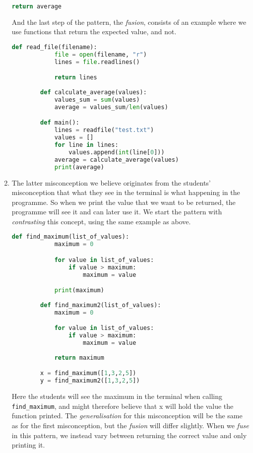 \begin{enumerate}
\begin{lstlisting}[language=Python]
            return average
    \end{lstlisting}

    And the last step of the pattern, the \emph{fusion}, consists of an 
example where we use functions that return the expected value, and not.

    \begin{lstlisting}[language=Python]
        def read_file(filename):
            file = open(filename, "r")
            lines = file.readlines()

            return lines
            
        def calculate_average(values):
            values_sum = sum(values)
            average = values_sum/len(values)

        def main():
            lines = readfile("test.txt")
            values = []
            for line in lines:
                values.append(int(line[0]))
            average = calculate_average(values)
            print(average)
    \end{lstlisting}

    \item The latter misconception we believe originates from the students' 
misconception that what they see in the terminal is what happening in 
the programme. So when we print the value that we want to be returned, 
the programme will see it and can later use it. We start the pattern 
with \emph{contrasting} this concept, using the same example as above.

     \begin{lstlisting}[language=Python]
        def find_maximum(list_of_values):
            maximum = 0

            for value in list_of_values:
                if value > maximum:
                    maximum = value

            print(maximum)
            
        def find_maximum2(list_of_values):
            maximum = 0

            for value in list_of_values:
                if value > maximum:
                    maximum = value
                    
            return maximum

        x = find_maximum([1,3,2,5])
        y = find_maximum2([1,3,2,5])
    \end{lstlisting}

    Here the students will see the maximum in the terminal when calling 
\texttt{find_maximum}, and might therefore believe that x 
will hold the value the function printed. The \emph{generalisation} for 
this misconception will be the same as for the first misconception, but 
the \emph{fusion} will differ slightly. When we \emph{fuse} in this 
pattern, we instead vary between returning the correct value and only 
printing it.


\end{enumerate}
